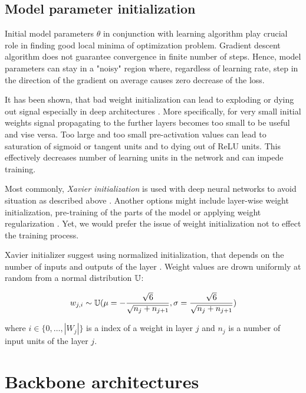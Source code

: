 \subsection{Model parameter initialization}

Initial model parameters $\theta$ in conjunction with learning algorithm play crucial role in finding good local minima of optimization problem.
Gradient descent algorithm does not guarantee convergence in finite number of steps.
Hence, model parameters can stay in a "noisy" region where, regardless of learning rate, step in the direction of the gradient on average causes zero decrease of the loss.

It has been shown, that bad weight initialization can lead to exploding or dying out signal especially in deep architectures \cite{Glorot2010}. More specifically, for very small initial weights signal propagating to the further layers becomes too small to be useful and vise versa.
Too large and too small pre-activation values can lead to saturation of sigmoid or tangent units and to dying out of ReLU units. This effectively decreases number of learning units in the network and can impede training.

Most commonly, \textit{Xavier initialization} is used with deep neural networks to avoid situation as described above \cite{Glorot2010}.
Another options might include layer-wise weight initialization, pre-training of the parts of the model \cite{Simonyan2015} or applying weight regularization \cite{Good2016}.
Yet, we would prefer the issue of weight initialization not to effect the training process.


Xavier initializer suggest using normalized initialization, that depends on the number of inputs and outputs of the layer \cite{Good2016}. Weight values are drown uniformly at random from a normal distribution $\Bbb{U}$:

\begin{equation}\label{eq:xavier}
  w_{j, i} \sim \Bbb{U}(
  \mu=-\frac{\sqrt{6}}{\sqrt{n_j+n_{j+1}}},
  \sigma=\frac{\sqrt{6}}{\sqrt{n_j+n_{j+1}}})
\end{equation}

where $i\in\{0, \ldots, |W_j|\}$ is a index of a weight in layer $j$ and $n_j$ is a number of input units of the layer $j$.


\section{Backbone architectures}

